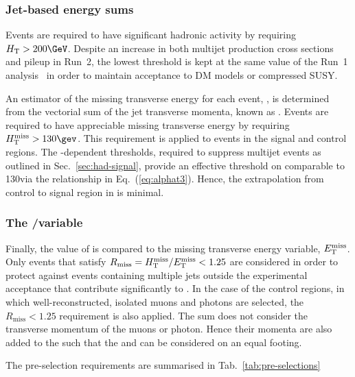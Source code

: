 \subsubsection{Jet-based energy sums}

Events are required to have significant hadronic activity by requiring
$\scalht > 200\GeV$. Despite an increase in both multijet production
cross sections and pileup in Run~2, the lowest \HT threshold is
kept at the same value of the Run~1 analysis~\cite{Chatrchyan:2013lya}
in order to maintain acceptance to DM models or compressed
SUSY. 

An estimator of the missing transverse energy for each event, \ETmiss,
is determined from the vectorial sum of the jet transverse momenta,
known as \mht. Events are required to have appreciable missing
transverse energy by requiring $\mht>130\gev$. This requirement is
applied to events in the signal and control regions. The
\scalht-dependent \alphat thresholds, required to suppress multijet
events as outlined in Sec.~\ref{sec:had-signal}, provide an effective
threshold on \mht comparable to 130\GeV via the relationship in
Eq.~(\ref{eq:alphat3}). Hence, the extrapolation from control to
signal region in \mht is minimal. 

\subsubsection{The \mht/\met variable}

Finally, the value of \mht is compared to the missing transverse
energy variable, $\mbox{$E_\text{T}^{\rm miss}$}$. Only events that satisfy
$R_{\mathrm{miss}}=\mbox{$H_{\rm T}^{\rm miss}$}/\mbox{$E_\text{T}^{\rm miss}$} < 1.25$ are considered in order to
protect against events containing multiple jets outside the
experimental acceptance that contribute significantly to \mht. In the
case of the control regions, in which well-reconstructed, isolated
muons and photons are selected, the $R_{\mathrm{miss}} < 1.25$
requirement is also applied. The \mht sum does not consider the
transverse momentum of the muons or photon. Hence their momenta are
also added to the \met such that the \mht and \met can be considered
on an equal footing.

The pre-selection requirements are summarised in Tab.~\ref{tab:pre-selections}

